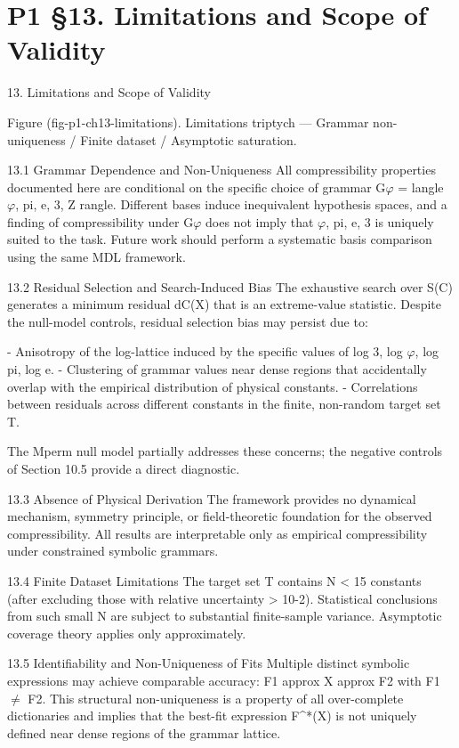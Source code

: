 
\section{P1 §13. Limitations and Scope of Validity}

13. Limitations and Scope of Validity

  Figure (fig-p1-ch13-limitations). Limitations triptych --- Grammar non-uniqueness / Finite dataset
                                       / Asymptotic saturation.

  13.1 Grammar Dependence and Non-Uniqueness
  All compressibility properties documented here are conditional on the specific choice of
  grammar G$\varphi$ = langle $\varphi$, pi, e, 3, Z rangle. Different bases induce inequivalent
  hypothesis spaces, and a finding of compressibility under G$\varphi$ does not imply that {$\varphi$, pi,
  e, 3} is uniquely suited to the task. Future work should perform a systematic basis
  comparison using the same MDL framework.

  13.2 Residual Selection and Search-Induced Bias
  The exhaustive search over S(C) generates a minimum residual dC(X) that is an
  extreme-value statistic. Despite the null-model controls, residual selection bias may
  persist due to:

  - Anisotropy of the log-lattice induced by the specific values of log 3, log $\varphi$, log pi, log e.
  - Clustering of grammar values near dense regions that accidentally overlap with the
  empirical distribution of physical constants.
  - Correlations between residuals across different constants in the finite, non-random
  target set T.

  The Mperm null model partially addresses these concerns; the negative controls of
  Section 10.5 provide a direct diagnostic.

  13.3 Absence of Physical Derivation
  The framework provides no dynamical mechanism, symmetry principle, or
  field-theoretic foundation for the observed compressibility. All results are interpretable
  only as empirical compressibility under constrained symbolic grammars.

  13.4 Finite Dataset Limitations
  The target set T contains N < 15 constants (after excluding those with relative
  uncertainty > 10-2). Statistical conclusions from such small N are subject to substantial
  finite-sample variance. Asymptotic coverage theory applies only approximately.

  13.5 Identifiability and Non-Uniqueness of Fits
  Multiple distinct symbolic expressions may achieve comparable accuracy: F1 approx X
  approx F2 with F1 $\neq$ F2. This structural non-uniqueness is a property of all
  over-complete dictionaries and implies that the best-fit expression F^*(X) is not
  uniquely defined near dense regions of the grammar lattice.

